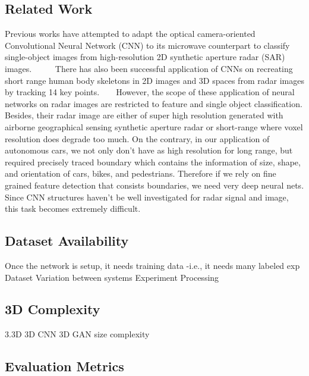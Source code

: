 \subsection{Related Work}
Previous works have attempted to adapt the optical camera-oriented Convolutional Neural Network (CNN) to its microwave counterpart to classify single-object images from high-resolution 2D synthetic aperture radar (SAR) images. ~\cite{SAR_DL} ~\cite{ship_SAR} ~\cite{change_SAR} There has also been successful application of CNNs on recreating short range human body skeletons in 2D images and 3D spaces from radar images by tracking 14 key points. ~\cite{rfpose} ~\cite{rfpose3D} However, the scope of these application of neural networks on radar images are restricted to feature and single object classification. Besides, their radar image are either of super high resolution generated with airborne geographical sensing synthetic aperture radar or short-range where voxel resolution does degrade too much. On the contrary, in our application of autonomous cars, we not only don't have as high resolution for long range, but required precisely traced boundary which contains the information of size, shape, and orientation of cars, bikes, and pedestrians. Therefore if we rely on fine grained feature detection that consists boundaries, we need very deep neural nets. Since CNN structures haven't be well investigated for radar signal and image, this task becomes extremely difficult.      

\subsection{Dataset Availability}
Once the network is setup, it needs training data -i.e., it needs many labeled exp
Dataset
	Variation between systems 
	Experiment
	Processing

\subsection{3D Complexity}
3.3D
3D CNN %
3D GAN size complexity


\subsection{Evaluation Metrics}


